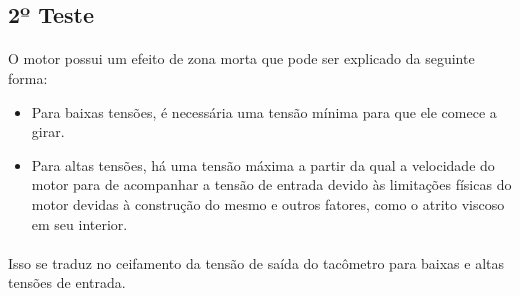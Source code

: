 \subsection{2º Teste}
\paragraph{}
O motor possui um efeito de zona morta que pode ser explicado da seguinte forma: 

\begin{itemize}
\item Para baixas tensões, é necessária uma tensão mínima para que ele comece a girar.
\item Para altas tensões, há uma tensão máxima a partir da qual a velocidade do motor para de acompanhar a tensão de entrada devido às limitações físicas do motor devidas à construção do mesmo e outros fatores, como o atrito viscoso em seu interior.
\end{itemize}

\paragraph{}
Isso se traduz no ceifamento da tensão de saída do tacômetro para baixas e altas tensões de entrada.